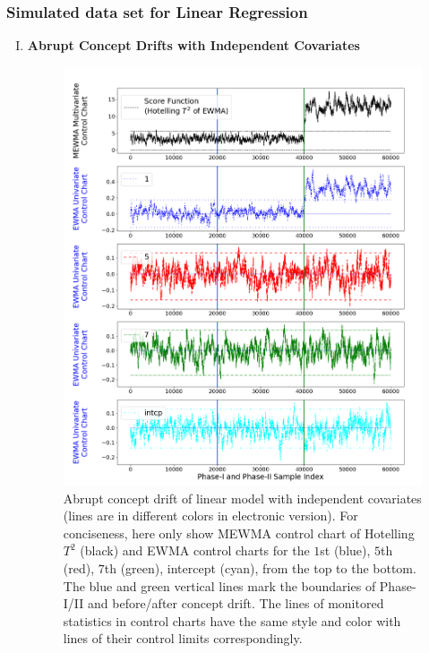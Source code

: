 \documentclass[twoside,11pt]{article}
\begin{document}
\subsubsection{Simulated data set for Linear Regression}
\label{sss:lin_exp}
\begin{enumerate}[(I)]
\item
\textbf{Abrupt Concept Drifts with Independent Covariates}
\label{ssss:lin_ind_pred}

\begin{figure}[!hpt]
\centering
  \includegraphics[width = 0.6\linewidth]{../figures/v14/sim_2/reg/neg_single_1_sim2_mlines_with_regu_1e-08_0_005.png}
  \caption{Abrupt concept drift of linear model with independent covariates (lines are in different colors in electronic version). For conciseness, here only show MEWMA control chart of Hotelling $T^2$ (black) and EWMA control charts for the $1$st (blue), $5$th (red), $7$th (green), intercept (cyan), from the top to the bottom. The blue and green vertical lines mark the boundaries of Phase-I/II and before/after concept drift. The lines of monitored statistics in control charts have the same style and color with lines of their control limits correspondingly.}
  \label{fig:lin_reg_ind_X}
\end{figure}

\end{enumerate}
\end{document}
